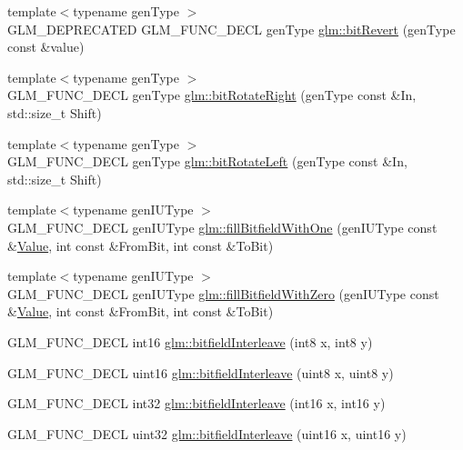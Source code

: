 \begin{DoxyCompactItemize}
{\footnotesize template$<$typename gen\+Type $>$ }\\G\+L\+M\+\_\+\+D\+E\+P\+R\+E\+C\+A\+T\+ED G\+L\+M\+\_\+\+F\+U\+N\+C\+\_\+\+D\+E\+CL gen\+Type \hyperlink{group__gtx__bit_ga2d3939fbf96aa54cb2fd3461a60aba02}{glm\+::bit\+Revert} (gen\+Type const \&value)
\item 
{\footnotesize template$<$typename gen\+Type $>$ }\\G\+L\+M\+\_\+\+F\+U\+N\+C\+\_\+\+D\+E\+CL gen\+Type \hyperlink{group__gtx__bit_gaf999dbfe97a5be5ea68841a58cf89a4a}{glm\+::bit\+Rotate\+Right} (gen\+Type const \&In, std\+::size\+\_\+t Shift)
\item 
{\footnotesize template$<$typename gen\+Type $>$ }\\G\+L\+M\+\_\+\+F\+U\+N\+C\+\_\+\+D\+E\+CL gen\+Type \hyperlink{group__gtx__bit_ga32c0a5149152a9aa75afafe81b19be53}{glm\+::bit\+Rotate\+Left} (gen\+Type const \&In, std\+::size\+\_\+t Shift)
\item 
{\footnotesize template$<$typename gen\+I\+U\+Type $>$ }\\G\+L\+M\+\_\+\+F\+U\+N\+C\+\_\+\+D\+E\+CL gen\+I\+U\+Type \hyperlink{group__gtx__bit_gafac2a9e0ef0d5d2fc4e569bff2b2f452}{glm\+::fill\+Bitfield\+With\+One} (gen\+I\+U\+Type const \&\hyperlink{document_8h_a071cf97155ba72ac9a1fc4ad7e63d481}{Value}, int const \&From\+Bit, int const \&To\+Bit)
\item 
{\footnotesize template$<$typename gen\+I\+U\+Type $>$ }\\G\+L\+M\+\_\+\+F\+U\+N\+C\+\_\+\+D\+E\+CL gen\+I\+U\+Type \hyperlink{group__gtx__bit_ga0c514d45387003260783ba6a8a4f3285}{glm\+::fill\+Bitfield\+With\+Zero} (gen\+I\+U\+Type const \&\hyperlink{document_8h_a071cf97155ba72ac9a1fc4ad7e63d481}{Value}, int const \&From\+Bit, int const \&To\+Bit)
\item 
G\+L\+M\+\_\+\+F\+U\+N\+C\+\_\+\+D\+E\+CL int16 \hyperlink{group__gtx__bit_ga479134317bc95d99f2b2e235d3db287b}{glm\+::bitfield\+Interleave} (int8 x, int8 y)
\item 
G\+L\+M\+\_\+\+F\+U\+N\+C\+\_\+\+D\+E\+CL uint16 \hyperlink{group__gtx__bit_ga0700a3ceb088a0ecc23d76c154096061}{glm\+::bitfield\+Interleave} (uint8 x, uint8 y)
\item 
G\+L\+M\+\_\+\+F\+U\+N\+C\+\_\+\+D\+E\+CL int32 \hyperlink{group__gtx__bit_ga1a0264598647ae00a596865af4e1e878}{glm\+::bitfield\+Interleave} (int16 x, int16 y)
\item 
G\+L\+M\+\_\+\+F\+U\+N\+C\+\_\+\+D\+E\+CL uint32 \hyperlink{group__gtx__bit_ga19ef8360379483e3ee245e89cb62ff93}{glm\+::bitfield\+Interleave} (uint16 x, uint16 y)

\end{DoxyCompactItemize}
